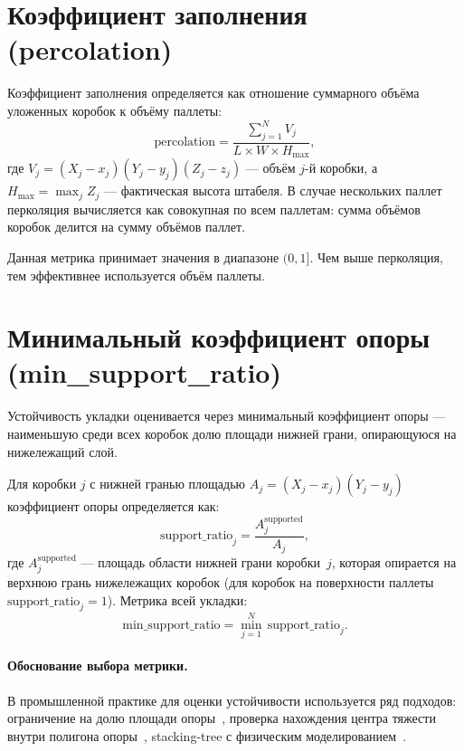 \section{Коэффициент заполнения (percolation)}
\label{sec:metric_perc}

Коэффициент заполнения определяется как отношение суммарного объёма уложенных коробок к объёму паллеты:
\[
\text{percolation} = \frac{\sum_{j=1}^{N} V_j}{L \times W \times H_{\max}},
\]
где $V_j = (X_j - x_j)(Y_j - y_j)(Z_j - z_j)$ --- объём $j$-й коробки, а $H_{\max} = \max_j Z_j$ --- фактическая высота штабеля. В случае нескольких паллет перколяция вычисляется как совокупная по всем паллетам: сумма объёмов коробок делится на сумму объёмов паллет.

Данная метрика принимает значения в диапазоне $(0, 1]$. Чем выше перколяция, тем эффективнее используется объём паллеты.

\section{Минимальный коэффициент опоры (min\_support\_ratio)}
\label{sec:metric_support}

Устойчивость укладки оценивается через минимальный коэффициент опоры --- наименьшую среди всех коробок долю площади нижней грани, опирающуюся на нижележащий слой.

Для коробки $j$ с нижней гранью площадью $A_j = (X_j - x_j)(Y_j - y_j)$ коэффициент опоры определяется как:
\[
\text{support\_ratio}_j = \frac{A_j^{\text{supported}}}{A_j},
\]
где $A_j^{\text{supported}}$ --- площадь области нижней грани коробки~$j$, которая опирается на верхнюю грань нижележащих коробок (для коробок на поверхности паллеты $\text{support\_ratio}_j = 1$). Метрика всей укладки:
\[
\text{min\_support\_ratio} = \min_{j=1}^{N}\, \text{support\_ratio}_j.
\]

\paragraph{Обоснование выбора метрики.}
В промышленной практике для оценки устойчивости используется ряд подходов: ограничение на долю площади опоры~\cite{Bischoff1995}, проверка нахождения центра тяжести внутри полигона опоры~\cite{Calzavara2021}, stacking-tree с физическим моделированием~\cite{Zhao2021}. 

